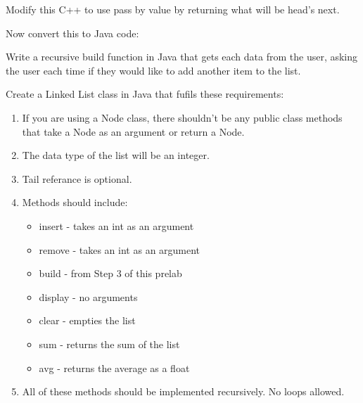 \documentclass[../../main.tex]{subfiles}
\begin{document}
\begin{steps}
      Modify this C++ to use pass by value by returning what will be head's next.\\
      \vspace{10cm}
   \item Now convert this to Java code:\\
      \vspace{10cm}
   \item Write a recursive build function in Java that gets each data from the user, asking the user
      each time if they would like to add another item to the list.\\
      \vspace{10cm}
   \item Create a Linked List class in Java that fufils these requirements:
   \begin{enumerate}[label=\Alph*.]
      \item If you are using a Node class, there shouldn't be any public
         class methods that take a Node as an argument or return a Node.
      \item The data type of the list will be an integer.
      \item Tail referance is optional.
      \item Methods should include:
         \begin{itemize}
            \item insert - takes an int as an argument
            \item remove - takes an int as an argument
            \item build - from Step 3 of this prelab
            \item display - no arguments
            \item clear - empties the list
            \item sum - returns the sum of the list
            \item avg - returns the average as a float
         \end{itemize}
      \item All of these methods should be implemented recursively. No loops allowed.
   \end{enumerate}
\end{steps}
\end{document}
